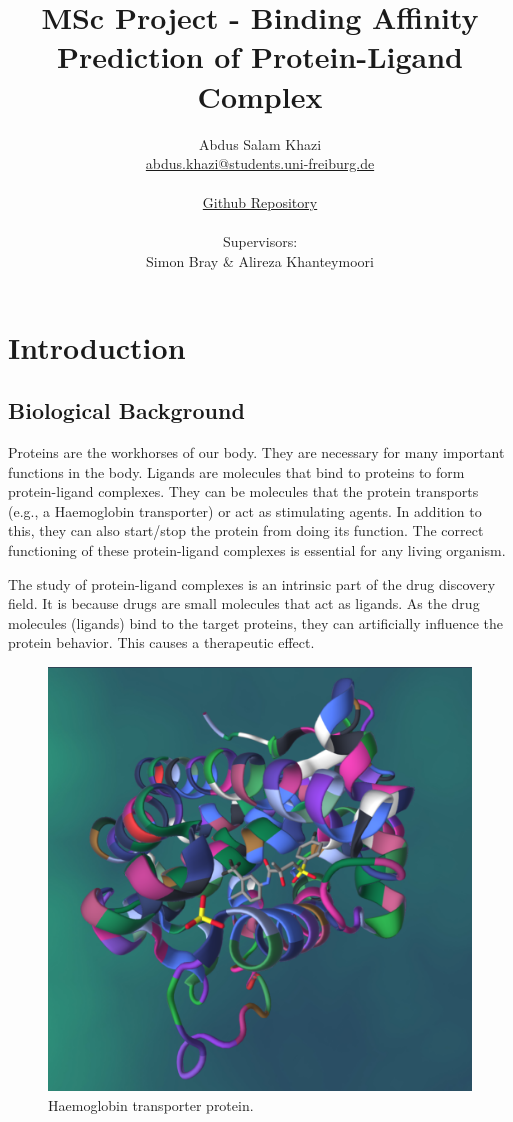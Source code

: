 \documentclass[11pt]{article}
\title{MSc Project - Binding Affinity Prediction of Protein-Ligand Complex}
\author{
        Abdus Salam Khazi\\
        \href{mailto:abdus.khazi@students.uni-freiburg.de}
                {abdus.khazi@students.uni-freiburg.de}\\ \\
        \href{https://github.com/abduskhazi/MSc-Project}
                {Github Repository} \cite{github_repository} \\ \\
        Supervisors:
        \begin{tabular}{ll}
			Simon Bray \&
			Alireza Khanteymoori
		\end{tabular}
       }
\begin{document}
\maketitle
\date{}
\tableofcontents
\newpage

\section{Introduction}

\subsection{Biological Background}
Proteins are the workhorses of our body.  They are necessary for many important functions in the body.  Ligands are molecules that bind to proteins to form protein-ligand complexes.  They can be molecules that the protein transports (e.g., a Haemoglobin transporter) or act as stimulating agents.  In addition to this, they can also start/stop the protein from doing its function.  The correct functioning of these protein-ligand complexes is essential for any living organism.

The study of protein-ligand complexes is an intrinsic part of the drug discovery field.  It is because drugs are small molecules that act as ligands.  As the drug molecules (ligands) bind to the target proteins, they can artificially influence the protein behavior.  This causes a therapeutic effect.

\begin{figure}[htb]
  \centering
    \includegraphics[scale=0.15]{images/pl_complex}
    \caption{Haemoglobin transporter protein.  \cite{PL_complex_introduction}}
    \label{fig:HaemoglobinTransporterImage}
\end{figure}
\end{document}
